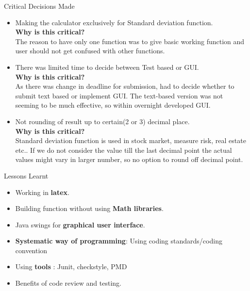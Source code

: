 \documentclass[final]{beamer}
\newlength{\onecolwid}
\newlength{\twocolwid}
\begin{document}
\begin{frame}
\begin{columns}[t]
\begin{column}{\twocolwid}
\begin{columns}[t,totalwidth=\twocolwid]
\begin{column}{\onecolwid}
\begin{exampleblock}{Critical Decisions Made}
\begin{itemize}
\item Making the calculator exclusively for Standard deviation function.\\
\textbf{Why is this critical?}\\
The reason to have only one function was to give basic working function and user should not get confused with other functions. 

\item   There was limited time to decide between Test based or GUI.\\
\textbf{Why is this critical?}\\
As there was change in deadline for submission, had to decide whether to submit text based or implement GUI. The text-based version was not seeming to be much effective, so within overnight developed GUI.

\item Not rounding of result up to certain(2 or 3) decimal place.\\
\textbf{Why is this critical?}\\
Standard deviation function is used in stock market, measure risk, real estate etc.. If we do not consider the value till the last decimal point the actual values might vary in larger number, so no option to round off decimal point.

\end{itemize}
\end{exampleblock}

\begin{exampleblock}{Lessons Learnt}
\begin{itemize}
\item Working in \textbf{latex}.
\item Building function without using \textbf{Math libraries}.
\item Java swings for \textbf{graphical user interface}.
\item \textbf{Systematic way of programming}: Using coding standards/coding convention
\item Using \textbf{tools} : Junit, checkstyle,  PMD
\item Benefits of code review  and testing.
\end{itemize}
\end{exampleblock}


\end{column}
\end{columns}
\end{column}
\end{columns}
\end{frame}
\end{document}
